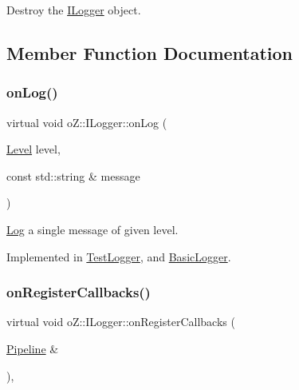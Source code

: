 Destroy the \mbox{\hyperlink{classo_z_1_1_i_logger}{I\+Logger}} object. 



\subsection{Member Function Documentation}
\mbox{\label{classo_z_1_1_i_logger_a2e0e168c9218055e41bdd5b57177cba1}} 
\subsubsection{\texorpdfstring{onLog()}{onLog()}}
{\footnotesize\ttfamily virtual void o\+Z\+::\+I\+Logger\+::on\+Log (\begin{DoxyParamCaption}\item[{\mbox{\hyperlink{namespaceo_z_a72fc7662d5f07391ac6f0a5699014bfa}{Level}}}]{level,  }\item[{const std\+::string \&}]{message }\end{DoxyParamCaption})\hspace{0.3cm}{\ttfamily [pure virtual]}}



\mbox{\hyperlink{classo_z_1_1_log}{Log}} a single message of given level. 



Implemented in \mbox{\hyperlink{class_test_logger_ae7b96502995c416dd4d4e7541f1ade80}{Test\+Logger}}, and \mbox{\hyperlink{class_basic_logger_a91033a43cfba1ab9235f1c7d035ff890}{Basic\+Logger}}.

\mbox{\label{classo_z_1_1_i_logger_a10732b6da6e8f085c6fe5fa154d361ef}} 
\subsubsection{\texorpdfstring{onRegisterCallbacks()}{onRegisterCallbacks()}}
{\footnotesize\ttfamily virtual void o\+Z\+::\+I\+Logger\+::on\+Register\+Callbacks (\begin{DoxyParamCaption}\item[{\mbox{\hyperlink{classo_z_1_1_pipeline}{Pipeline}} \&}]{ }\end{DoxyParamCaption})\hspace{0.3cm}{\ttfamily [inline]}, {\ttfamily [virtual]}}



